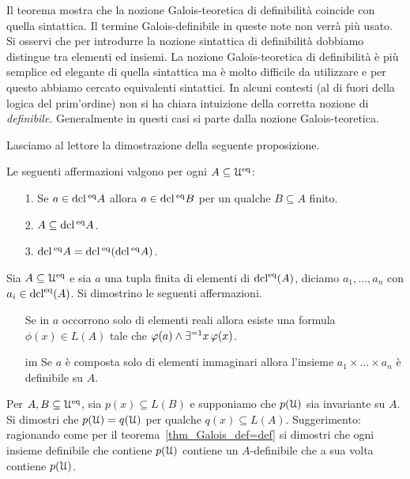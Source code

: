 Il teorema mostra che la nozione Galois-teoretica di definibilit\`a coincide con quella sintattica.  Il termine Galois-definibile in queste note non verr\`a pi\`u usato. Si osservi che per introdurre la nozione sintattica di definibilit\`a dobbiamo distingue tra elementi ed insiemi. La nozione  Galois-teoretica di definibilit\`a \`e pi\`u semplice ed elegante di quella sintattica ma \`e molto difficile da utilizzare e per questo abbiamo cercato equivalenti sintattici. In alcuni contesti (al di fuori della logica del prim'ordine) non si ha chiara intuizione della corretta nozione di \textit{definibile}. Generalmente in questi casi si parte dalla nozione Galois-teoretica.

Lasciamo al lettore la dimostrazione della seguente proposizione.

\begin{proposition}\label{dcl123} Le seguenti affermazioni valgono per ogni $A\subseteq\EuScript U^{\rm eq}$:
\begin{itemize}
\item[1.]  Se $a\in\mathop{\rm dcl}\/^{\rm eq} A$ allora $a\in\mathop{\rm dcl}\/^{\rm eq} B$ per un qualche $B\subseteq A$ finito.
\item[2.]  $A\subseteq \mathop{\rm dcl}\/^{\rm eq} A$.
\item[3.]  $\mathop{\rm dcl}\/^{\rm eq} A=\mathop{\rm dcl}\/^{\rm eq}(\mathop{\rm dcl}\/^{\rm eq} A)$.\QED
\end{itemize} 
\end{proposition}

\begin{exercise}\label{definibilituple}
Sia $A\subseteq\EuScript U^{\rm eq}$ e sia $a$ una tupla finita di elementi di $\mathop{\rm dcl}^{\rm eq}(A)$, diciamo $a_1,\dots,a_n$ con $a_i\in\mathop{\rm dcl}^{\rm eq}(A)$. Si dimostrino le seguenti affermazioni.
\begin{itemize}
\item[\re] Se in $a$ occorrono solo di elementi reali allora esiste una formula $\phi(x)\in L(A)$ tale che $\varphi(a)\wedge\exists ^{=1}x\,\varphi(x)$. 
\item[im] Se $a$ \`e composta solo di elementi immaginari allora l'insieme $a_1\times\dots\times a_n$ \`e definibile su $A$.\QED
\end{itemize}
\end{exercise}


\begin{exercise}
Per $A,B\subseteq\EuScript U^{\rm eq}$, sia $p(x)\subseteq L(B)$ e supponiamo che $p(\EuScript U)$ sia invariante su $A$. Si dimostri che $p(\EuScript U)=q(\EuScript U)$ per qualche $q(x)\subseteq L(A)$.  Suggerimento: ragionando come per il teorema~\ref{thm_Galois_def=def} si dimostri che ogni insieme definibile che contiene $p(\EuScript U)$ contiene un $A$-definibile che a sua volta contiene $p(\EuScript U)$.
\end{exercise}




